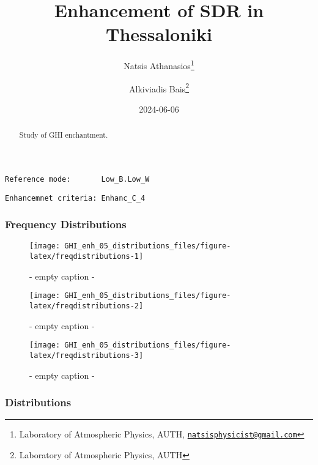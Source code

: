 \documentclass[
  10pt,
  a4paper,oneside]{article}
\title{Enhancement of SDR in Thessaloniki}
\author{Natsis Athanasios\footnote{Laboratory of Atmospheric Physics, AUTH, \href{mailto:natsisphysicist@gmail.com}{\nolinkurl{natsisphysicist@gmail.com}}} \and Alkiviadis Bais\footnote{Laboratory of Atmospheric Physics, AUTH}}
\date{2024-06-06}
\begin{document}
\maketitle
\begin{abstract}
Study of GHI enchantment.
\end{abstract}

{
\hypersetup{linkcolor=}
\setcounter{tocdepth}{4}
\tableofcontents
}
\begin{verbatim}
Reference mode:       Low_B.Low_W 
\end{verbatim}

\begin{verbatim}
Enhancemnet criteria: Enhanc_C_4 
\end{verbatim}

\FloatBarrier

\hypertarget{frequency-distributions}{%
\subsubsection{Frequency Distributions}\label{frequency-distributions}}

\begin{figure}[H]

{\centering \texttt{[image: GHI\_enh\_05\_distributions\_files/figure-latex/freqdistributions-1]} 

}

\caption{ - empty caption - }\label{fig:freqdistributions-1}
\end{figure}
\begin{figure}[H]

{\centering \texttt{[image: GHI\_enh\_05\_distributions\_files/figure-latex/freqdistributions-2]} 

}

\caption{ - empty caption - }\label{fig:freqdistributions-2}
\end{figure}
\begin{figure}[H]

{\centering \texttt{[image: GHI\_enh\_05\_distributions\_files/figure-latex/freqdistributions-3]} 

}

\caption{ - empty caption - }\label{fig:freqdistributions-3}
\end{figure}

\FloatBarrier

\hypertarget{distributions}{%
\subsubsection{Distributions}\label{distributions}}
\end{document}

